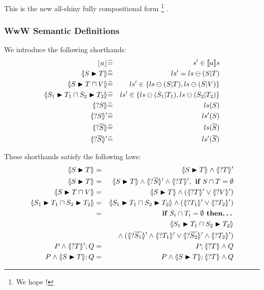 This is the new all-shiny fully compositional form%
\footnote{We hope !}%
.


\subsubsection{WwW Semantic Definitions}

We introduce the following shorthands:
\begin{eqnarray*}
   \ado a &\defs& \atomdo a
\\ \LUPD S T &\defs& \lupd S T
\\ \LUPD S {T \ndc V}
   &\defs&
   ls' \in \setof{\lexc S T, \lexc S V}
\\ \LNDC{S_1}{T_1}{S_2}{T_2}
   &\defs&
   ls' \in \setof{\lexc{S_1}{T_1}, \lexc{S_2}{T_2}}
\\ \LS S &\defs& ls(S)
\\ \LSd S &\defs& ls'(S)
\\ \LS{\B S} &\defs& ls(\B S)
\\ \LSd{\B S} &\defs& ls'(\B S)
\end{eqnarray*}

These  shorthands satisfy the following laws:
\begin{eqnarray*}
   \LUPD S T &=& \LUPD S T \land \LSd T
\\ \LUPD S T &=& \LUPD S T \land \LSd{\B S} \land \LSd T, \textbf{ if }S \cap T = \emptyset
\\ \LUPD S {T\ndc V} &=& \LUPD S T \land (\LSd T \lor \LSd V)
\\ \LNDC{S_1}{T_1}{S_2}{T_2}
   &=&
   \LNDC{S_1}{T_1}{S_2}{T_2}  \land (\LSd{T_1} \lor \LSd{T_2})
\\ &=& \textbf{ if }S_i \cap T_i = \emptyset \textbf{ then\ldots}
\\&& \LNDC{S_1}{T_1}{S_2}{T_2}
\\&& {} \land (\LSd{\B{S_1}}\land\LSd{T_1}
            \lor
            \LSd{\B{S_2}}\land\LSd{T_2})
\\ P \land \LSd T ; Q
   &=&
   P ; \LS T \land Q
\\ P \land \LUPD S T ; Q
   &=&
   P \land \LUPD S T ; \LS T \land Q
\end{eqnarray*}

